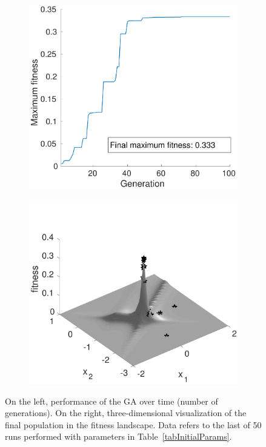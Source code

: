 \documentclass[12pt,titlepage]{article}
\begin{document}
\vspace*{-1.1cm}
\begin{figure}[htbp]
\centering
\begin{subfigure}[b]{0.45\textwidth}
\includegraphics[width=\textwidth]{../Figures/maxFitness.pdf}
\caption{}
\label{subfig::fitnessovertime}
\end{subfigure} \hfill
\begin{subfigure}[b]{0.525\textwidth}
\includegraphics[width=\textwidth]{../Figures/finalPop.pdf}
\caption{}
\label{subfig::finalpop}
\end{subfigure}
\caption{On the left, performance of the GA over time (number of generations). On the right, three-dimensional visualization of the final population in the fitness landscape. Data refers to the last of 50 runs performed with parameters in Table~\ref{tabInitialParams}.} \label{fig::GAtest}
\end{figure}
\end{document}
